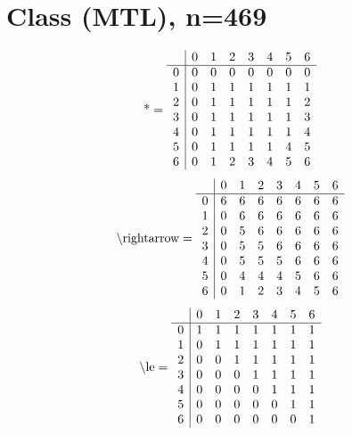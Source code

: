 \documentclass[11pt]{article}
\begin{document}
\section{Class (MTL), n=469}
\[\text{*} = 
\begin{array}{r | r r r r r r r}
 & 0 & 1 & 2 & 3 & 4 & 5 & 6 \\ \hline
0 & 0 & 0 & 0 & 0 & 0 & 0 & 0 \\
1 & 0 & 1 & 1 & 1 & 1 & 1 & 1 \\
2 & 0 & 1 & 1 & 1 & 1 & 1 & 2 \\
3 & 0 & 1 & 1 & 1 & 1 & 1 & 3 \\
4 & 0 & 1 & 1 & 1 & 1 & 1 & 4 \\
5 & 0 & 1 & 1 & 1 & 1 & 4 & 5 \\
6 & 0 & 1 & 2 & 3 & 4 & 5 & 6 \\
\end{array}
\]
\[\text{\textbackslash rightarrow} = 
\begin{array}{r | r r r r r r r}
 & 0 & 1 & 2 & 3 & 4 & 5 & 6 \\ \hline
0 & 6 & 6 & 6 & 6 & 6 & 6 & 6 \\
1 & 0 & 6 & 6 & 6 & 6 & 6 & 6 \\
2 & 0 & 5 & 6 & 6 & 6 & 6 & 6 \\
3 & 0 & 5 & 5 & 6 & 6 & 6 & 6 \\
4 & 0 & 5 & 5 & 5 & 6 & 6 & 6 \\
5 & 0 & 4 & 4 & 4 & 5 & 6 & 6 \\
6 & 0 & 1 & 2 & 3 & 4 & 5 & 6 \\
\end{array}
\]
\[\text{\textbackslash le} = 
\begin{array}{r | r r r r r r r}
 & 0 & 1 & 2 & 3 & 4 & 5 & 6 \\ \hline
0 & 1 & 1 & 1 & 1 & 1 & 1 & 1 \\
1 & 0 & 1 & 1 & 1 & 1 & 1 & 1 \\
2 & 0 & 0 & 1 & 1 & 1 & 1 & 1 \\
3 & 0 & 0 & 0 & 1 & 1 & 1 & 1 \\
4 & 0 & 0 & 0 & 0 & 1 & 1 & 1 \\
5 & 0 & 0 & 0 & 0 & 0 & 1 & 1 \\
6 & 0 & 0 & 0 & 0 & 0 & 0 & 1 \\
\end{array}
\]
\end{document}
